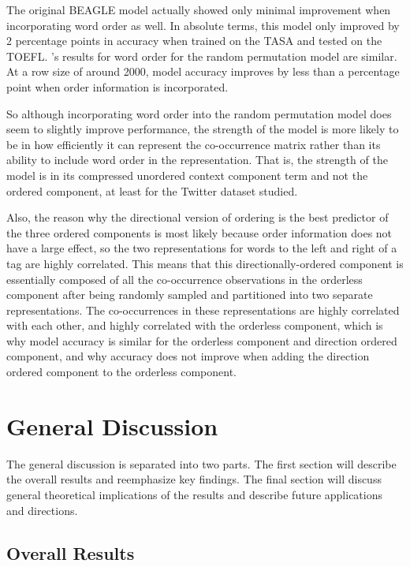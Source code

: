 \documentclass[man,donotrepeattitle]{apa6}
\begin{document}
The original BEAGLE model \parencite{Jones2007} actually showed only minimal improvement when incorporating word order as well.
In absolute terms, this model only improved by 2 percentage points in accuracy when trained on the TASA and tested on the TOEFL.
\textcite{Sahlgren2008}'s results for word order for the random permutation model are similar.
At a row size of around \num{2000}, model accuracy improves by less than a percentage point when order information is incorporated.

So although incorporating word order into the random permutation model does seem to slightly improve performance,
the strength of the model is more likely to be in how efficiently it can represent the co-occurrence matrix rather than its ability to include word order in the representation.
That is, the strength of the model is in its compressed unordered context component term and not the ordered component, at least for the Twitter dataset studied.

Also, the reason why the directional version of ordering is the best predictor of the three ordered components is most likely because order information does not have a large effect,
so the two representations for words to the left and right of a tag are highly correlated.
This means that this directionally-ordered component is essentially composed of all the co-occurrence observations in the orderless component after being randomly sampled and partitioned into two separate representations.
The co-occurrences in these representations are highly correlated with each other, and highly correlated with the orderless component,
which is why model accuracy is similar for the orderless component and direction ordered component, and why accuracy does not improve when adding the direction ordered component to the orderless component.

\section{General Discussion}

The general discussion is separated into two parts.
The first section will describe the overall results and reemphasize key findings.
The final section will discuss general theoretical implications of the results and describe future applications and directions. 

\subsection{Overall Results}
\end{document}
